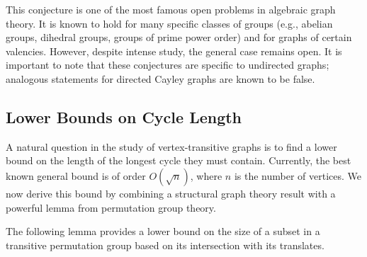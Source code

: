 \documentclass[12pt,a4paper,openany]{book}
\begin{document}
This conjecture is one of the most famous open problems in algebraic graph theory. It is known to hold for many specific classes of groups (e.g., abelian groups, dihedral groups, groups of prime power order) and for graphs of certain valencies. However, despite intense study, the general case remains open. It is important to note that these conjectures are specific to undirected graphs; analogous statements for directed Cayley graphs are known to be false.


\subsection{Lower Bounds on Cycle Length}

A natural question in the study of vertex-transitive graphs is to find a lower bound on the length of the longest cycle they must contain. Currently, the best known general bound is of order $O(\sqrt{n})$, where $n$ is the number of vertices. We now derive this bound by combining a structural graph theory result with a powerful lemma from permutation group theory.

The following lemma provides a lower bound on the size of a subset in a transitive permutation group based on its intersection with its translates.
\end{document}
